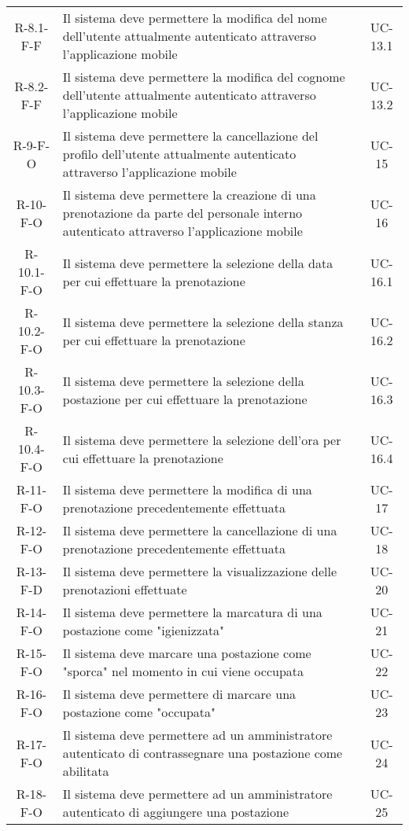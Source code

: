 \begin{longtable}{ c C{9cm} c }
    R-8.1-F-F & Il sistema deve permettere la modifica del nome dell'utente attualmente autenticato attraverso l'applicazione mobile & UC-13.1 \\
    R-8.2-F-F & Il sistema deve permettere la modifica del cognome dell'utente attualmente autenticato attraverso l'applicazione mobile & UC-13.2 \\
    R-9-F-O & Il sistema deve permettere la cancellazione del profilo dell'utente attualmente autenticato attraverso l'applicazione mobile & UC-15 \\
    R-10-F-O & Il sistema deve permettere la creazione di una prenotazione da parte del personale interno autenticato attraverso l'applicazione mobile & UC-16 \\
    R-10.1-F-O & Il sistema deve permettere la selezione della data per cui effettuare la prenotazione & UC-16.1 \\
    R-10.2-F-O & Il sistema deve permettere la selezione della stanza per cui effettuare la prenotazione & UC-16.2 \\
    R-10.3-F-O & Il sistema deve permettere la selezione della postazione per cui effettuare la prenotazione & UC-16.3 \\
    R-10.4-F-O & Il sistema deve permettere la selezione dell'ora per cui effettuare la prenotazione & UC-16.4 \\
    R-11-F-O & Il sistema deve permettere la modifica di una prenotazione precedentemente effettuata & UC-17 \\
    R-12-F-O & Il sistema deve permettere la cancellazione di una prenotazione precedentemente effettuata & UC-18 \\
    R-13-F-D & Il sistema deve permettere la visualizzazione delle prenotazioni effettuate & UC-20 \\
    R-14-F-O & Il sistema deve permettere la marcatura di una postazione come "igienizzata" & UC-21 \\
    R-15-F-O & Il sistema deve marcare una postazione come "sporca" nel momento in cui viene occupata & UC-22 \\
    R-16-F-O & Il sistema deve permettere di marcare una postazione come "occupata" & UC-23 \\
    R-17-F-O & Il sistema deve permettere ad un amministratore autenticato di contrassegnare una postazione come abilitata & UC-24 \\
    R-18-F-O & Il sistema deve permettere ad un amministratore autenticato di aggiungere una postazione & UC-25 \\

\end{longtable}
